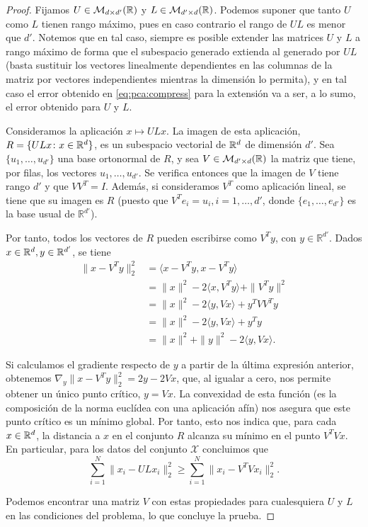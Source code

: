 \documentclass{book}
\begin{document}
\begin{proof}
	Fijamos $U \in \mathcal{M}_{d\times d'}(\mathbb{R})$ y $L \in \mathcal{M}_{d'\times d}(\mathbb{R})$. Podemos suponer que tanto $U$ como $L$ tienen rango máximo, pues en caso contrario el rango de $UL$ es menor que $d'$. Notemos que en tal caso, siempre es posible extender las matrices $U$ y $L$ a rango máximo de forma que el subespacio generado extienda al generado por $UL$ (basta sustituir los vectores linealmente dependientes en las columnas de la matriz por vectores independientes mientras la dimensión lo permita), y en tal caso el error obtenido en \ref{eq:pca:compress} para la extensión va a ser, a lo sumo, el error obtenido para $U$ y $L$.

	Consideramos la aplicación $x \mapsto ULx$. La imagen de esta aplicación, $R = \{ ULx \colon x \in \mathbb{R}^d \}$, es un subespacio vectorial de $\mathbb{R}^d$ de dimensión $d'$. Sea $\{u_1,\dots,u_{d'}\}$ una base ortonormal de $R$, y sea $V \in \mathcal{M}_{d'\times d}(\mathbb{R})$ la matriz que tiene, por filas, los vectores $u_1,\dots,u_{d'}$. Se verifica entonces que la imagen de $V$ tiene rango $d'$ y que $VV^T = I$. Además, si consideramos $V^T$ como aplicación lineal, se tiene que su imagen es $R$ (puesto que $V^Te_i = u_i, i = 1,\dots,d'$, donde $\{e_1,\dots,e_{d'}\}$ es la base usual de $\mathbb{R}^{d'}$).

	Por tanto, todos los vectores de $R$ pueden escribirse como $V^Ty$, con $y \in \mathbb{R}^{d'}$. Dados $x \in \mathbb{R}^d, y \in \mathbb{R}^{d'}$, se tiene
	\begin{align*}
	\|x-V^Ty\|_2^2 &= \langle x- V^Ty, x - V^Ty \rangle \\
				   &= \|x\|^2 - 2\langle x,V^T y\rangle + \|V^Ty\|^2 \\
				   &= \|x\|^2 - 2\langle y,Vx \rangle + y^TVV^Ty \\
				   &= \|x\|^2 - 2\langle y,Vx \rangle + y^Ty \\
				   &= \|x\|^2 + \|y\|^2 - 2 \langle y,Vx \rangle.
	\end{align*}

	Si calculamos el gradiente respecto de $y$ a partir de la última expresión anterior, obtenemos $\nabla_y \|x-V^Ty\|_2^2 = 2y - 2Vx$, que, al igualar a cero, nos permite obtener un único punto crítico, $y = Vx$. La convexidad de esta función (es la composición de la norma euclídea con una aplicación afín) nos asegura que este punto crítico es un mínimo global. Por tanto, esto nos indica que, para cada $x \in \mathbb{R}^d$, la distancia a $x$ en el conjunto $R$ alcanza su mínimo en el punto $V^TVx$. En particular, para los datos del conjunto $\mathcal{X}$ concluimos que
	\[ \sum_{i=1}^N \|x_i - ULx_i\|_2^2 \ge \sum_{i=1}^N\|x_i - V^TV x_i\|^2_2. \]

	Podemos encontrar una matriz $V$ con estas propiedades para cualesquiera $U$ y $L$ en las condiciones del problema, lo que concluye la prueba.
\end{proof}
\end{document}
